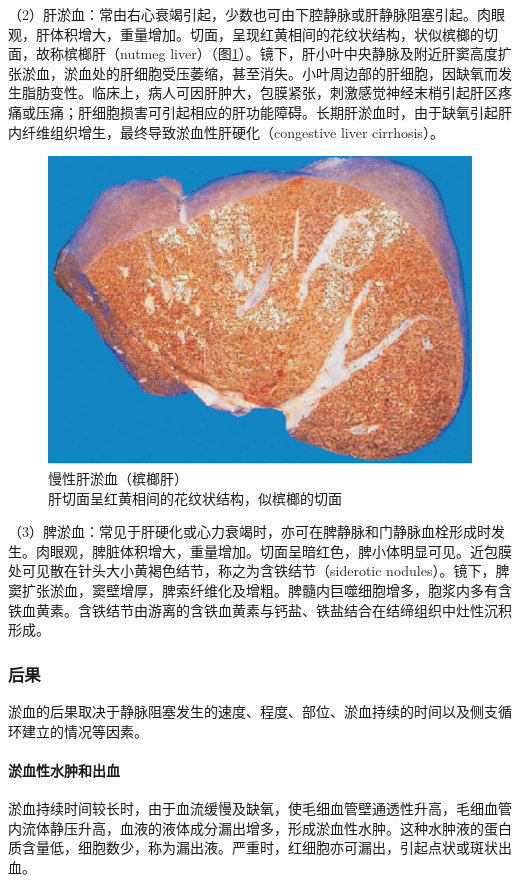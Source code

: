 （2）肝淤血：常由右心衰竭引起，少数也可由下腔静脉或肝静脉阻塞引起。肉眼观，肝体积增大，重量增加。切面，呈现红黄相间的花纹状结构，状似槟榔的切面，故称槟榔肝（nutmeg
liver）（图\ref{fig3-3}）。镜下，肝小叶中央静脉及附近肝窦高度扩张淤血，淤血处的肝细胞受压萎缩，甚至消失。小叶周边部的肝细胞，因缺氧而发生脂肪变性。临床上，病人可因肝肿大，包膜紧张，刺激感觉神经末梢引起肝区疼痛或压痛；肝细胞损害可引起相应的肝功能障碍。长期肝淤血时，由于缺氧引起肝内纤维组织增生，最终导致淤血性肝硬化（congestive
liver cirrhosis）。

\begin{figure}[!htbp]
  \centering
  \includegraphics{./images/Image00036.jpg}
  \caption{慢性肝淤血（槟榔肝）\\ {\small 肝切面呈红黄相间的花纹状结构，似槟榔的切面}}
  \label{fig3-3}
\end{figure}

（3）脾淤血：常见于肝硬化或心力衰竭时，亦可在脾静脉和门静脉血栓形成时发生。肉眼观，脾脏体积增大，重量增加。切面呈暗红色，脾小体明显可见。近包膜处可见散在针头大小黄褐色结节，称之为含铁结节（siderotic
nodules）。镜下，脾窦扩张淤血，窦壁增厚，脾索纤维化及增粗。脾髓内巨噬细胞增多，胞浆内多有含铁血黄素。含铁结节由游离的含铁血黄素与钙盐、铁盐结合在结缔组织中灶性沉积形成。

\subsubsection{后果}

淤血的后果取决于静脉阻塞发生的速度、程度、部位、淤血持续的时间以及侧支循环建立的情况等因素。

\paragraph{淤血性水肿和出血}
淤血持续时间较长时，由于血流缓慢及缺氧，使毛细血管壁通透性升高，毛细血管内流体静压升高，血液的液体成分漏出增多，形成淤血性水肿。这种水肿液的蛋白质含量低，细胞数少，称为漏出液。严重时，红细胞亦可漏出，引起点状或斑状出血。

